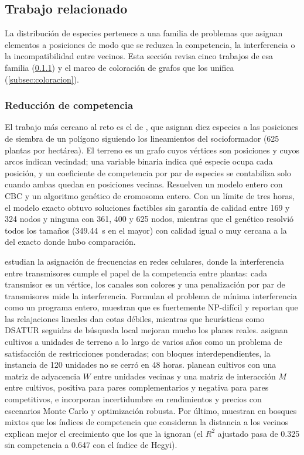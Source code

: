 \subsection{Trabajo relacionado}
\label{sec:trabajo-relacionado}

La distribución de especies pertenece a una familia de problemas que asignan elementos a posiciones de modo que se reduzca la competencia, la interferencia o la incompatibilidad entre vecinos. Esta sección revisa cinco trabajos de esa familia (\cref{subsec:competencia-literatura}) y el marco de coloración de grafos que los unifica (\cref{subsec:coloracion}).

\subsubsection{Reducción de competencia}
\label{subsec:competencia-literatura}

El trabajo más cercano al reto es el de \textcite{elizalde2025}, que asignan diez especies a las posiciones de siembra de un polígono siguiendo los lineamientos del socioformador (625 plantas por hectárea). El terreno es un grafo cuyos vértices son posiciones y cuyos arcos indican vecindad; una variable binaria indica qué especie ocupa cada posición, y un coeficiente de competencia por par de especies se contabiliza solo cuando ambas quedan en posiciones vecinas. Resuelven un modelo entero con CBC y un algoritmo genético de cromosoma entero. Con un límite de tres horas, el modelo exacto obtuvo soluciones factibles sin garantía de calidad entre 169 y 324 nodos y ninguna con 361, 400 y 625 nodos, mientras que el genético resolvió todos los tamaños (349.44~s en el mayor) con calidad igual o muy cercana a la del exacto donde hubo comparación.

\textcite{eisenblatter2002} estudian la asignación de frecuencias en redes celulares, donde la interferencia entre transmisores cumple el papel de la competencia entre plantas: cada transmisor es un vértice, los canales son colores y una penalización por par de transmisores mide la interferencia. Formulan el problema de mínima interferencia como un programa entero, muestran que es fuertemente NP-difícil y reportan que las relajaciones lineales dan cotas débiles, mientras que heurísticas como DSATUR seguidas de búsqueda local mejoran mucho los planes reales. \textcite{akplogan2011} asignan cultivos a unidades de terreno a lo largo de varios años como un problema de satisfacción de restricciones ponderadas; con bloques interdependientes, la instancia de 120 unidades no se cerró en 48 horas. \textcite{liu2026} planean cultivos con una matriz de adyacencia $W$ entre unidades vecinas y una matriz de interacción $M$ entre cultivos, positiva para pares complementarios y negativa para pares competitivos, e incorporan incertidumbre en rendimientos y precios con escenarios Monte Carlo y optimización robusta. Por último, \textcite{kobal2025} muestran en bosques mixtos que los índices de competencia que consideran la distancia a los vecinos explican mejor el crecimiento que los que la ignoran (el $R^{2}$ ajustado pasa de 0.325 sin competencia a 0.647 con el índice de Hegyi).

